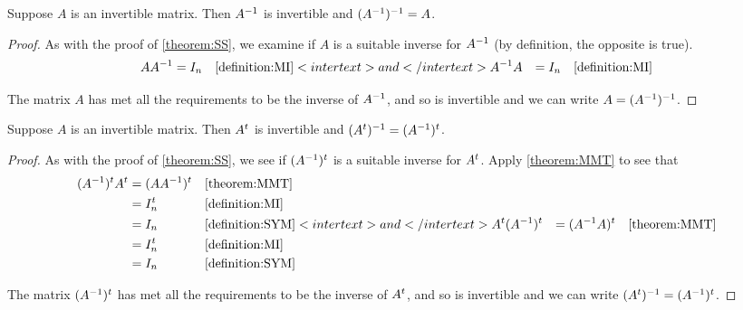 \documentclass{ximera}
\begin{document}
\begin{theorem}
  \label{theorem:MIMI}

  Suppose $A$ is an invertible matrix.  Then $A^{-1}$ is invertible and $(A^{-1})^{-1}=A$.

  \begin{proof}
    As with the proof of \ref{theorem:SS}, we examine if $A$ is a suitable inverse for $A^{-1}$ (by definition, the opposite is true).
    \begin{align*}
      AA^{-1}&=I_n&&\ref{definition:MI}
                          <intertext>and</intertext>
                          A^{-1}A&=I_n&&\ref{definition:MI}
    \end{align*}

    The matrix $A$ has met all the requirements to be the inverse of $A^{-1}$, and so is invertible and we can write $A=(A^{-1})^{-1}$.

  \end{proof}
\end{theorem}

\begin{theorem}
  \label{theorem:MIT}

  Suppose $A$ is an invertible matrix.  Then $A^{t}$ is invertible and $(A^{t})^{-1}=(A^{-1})^{t}$.

  \begin{proof}
    As with the proof of \ref{theorem:SS}, we see if $(A^{-1})^{t}$ is a suitable inverse for $A^{t}$. Apply \ref{theorem:MMT} to see that
    \begin{align*}
      (A^{-1})^{t}A^{t}
      &=(AA^{-1})^{t}&&\ref{theorem:MMT}\\
      &=I_n^{t}&&\ref{definition:MI}\\
      &=I_n&&\ref{definition:SYM}
              <intertext>and</intertext>
              A^{t}(A^{-1})^{t}
      &=(A^{-1}A)^{t}&&\ref{theorem:MMT}\\
      &=I_n^{t}&&\ref{definition:MI}\\
      &=I_n&&\ref{definition:SYM}
    \end{align*}

    The matrix $(A^{-1})^{t}$ has met all the
    requirements to be the inverse of $A^{t}$, and so is
    invertible and we can write
    $(A^{t})^{-1}=(A^{-1})^{t}$.

\end{proof}
\end{theorem}
\end{document}
